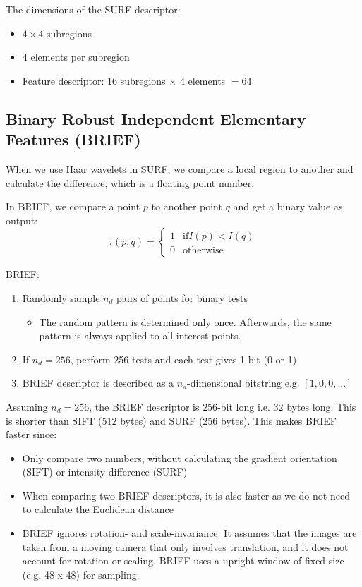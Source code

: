 \documentclass{report}
\begin{document}
The dimensions of the SURF descriptor:
\begin{itemize}
    \item $4 \times 4$ subregions 
    \item $4$ elements per subregion 
    \item Feature descriptor: $16$ subregions $\times$ $4$ elements $= 64$
\end{itemize}

\subsection{Binary Robust Independent Elementary Features (BRIEF)}

When we use Haar wavelets in SURF, we compare a local region to another and calculate the difference,
which is a floating point number.

In BRIEF, we compare a point $p$ to another point $q$ and get a binary value as
output:
$$
    \tau(p,q) = \begin{cases}
        1 & \text{if} I(p) < I(q) \\ 
        0 & \text{otherwise}
    \end{cases}
$$

BRIEF:
\begin{enumerate}
    \item Randomly sample $n_d$ pairs of points for binary tests
    \begin{itemize}
        \item The random pattern is determined only once. Afterwards, the same pattern is
        always applied to all interest points.
    \end{itemize}

    \item If $n_d = 256$, perform 256 tests and each test gives 1 bit (0 or 1)
    \item BRIEF descriptor is described as a $n_d$-dimensional bitstring e.g. $[1,0,0,...]$
\end{enumerate}

Assuming $n_d = 256$, the BRIEF descriptor is $256$-bit long i.e. $32$ bytes
long. This is shorter than SIFT (512 bytes) and SURF (256 bytes). This makes
BRIEF faster since:
\begin{itemize}
    \item Only compare two numbers, without calculating the gradient orientation
    (SIFT) or intensity difference (SURF)
    \item When comparing two BRIEF descriptors, it is also faster as we do not
    need to calculate the Euclidean distance
    \item BRIEF ignores rotation- and scale-invariance. It assumes that the images are taken from a moving camera that only
    involves translation, and it does not account for rotation or scaling.
    BRIEF uses a upright window of fixed size (e.g. 48 x 48) for sampling. 
\end{itemize}
\end{document}
